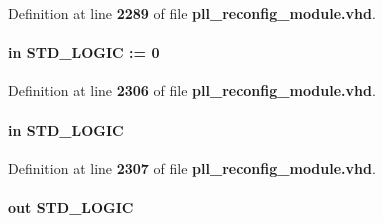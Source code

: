 Definition at line {\bf 2289} of file {\bf pll\+\_\+reconfig\+\_\+module.\+vhd}.

\paragraph[{write\+\_\+from\+\_\+rom}]{ {\bfseries \textcolor{keywordflow}{in}\textcolor{vhdlchar}{ }} {\bfseries \textcolor{comment}{S\+T\+D\+\_\+\+L\+O\+G\+IC}\textcolor{vhdlchar}{ }\textcolor{vhdlchar}{ }\textcolor{vhdlchar}{\+:}\textcolor{vhdlchar}{=}\textcolor{vhdlchar}{ }\textcolor{vhdlchar}{ }\textcolor{vhdlchar}{\textquotesingle{}}\textcolor{vhdlchar}{ } \textcolor{vhdldigit}{0} \textcolor{vhdlchar}{ }\textcolor{vhdlchar}{\textquotesingle{}}\textcolor{vhdlchar}{ }} \hspace{0.3cm}{\ttfamily [Port]}}\label{classpll__reconfig__module_a3a117e5372127e30390dddee9408218d}


Definition at line {\bf 2306} of file {\bf pll\+\_\+reconfig\+\_\+module.\+vhd}.

\paragraph[{write\+\_\+param}]{ {\bfseries \textcolor{keywordflow}{in}\textcolor{vhdlchar}{ }} {\bfseries \textcolor{comment}{S\+T\+D\+\_\+\+L\+O\+G\+IC}\textcolor{vhdlchar}{ }} \hspace{0.3cm}{\ttfamily [Port]}}\label{classpll__reconfig__module_a82026b0fa741fbd66ededcb4aed215f3}


Definition at line {\bf 2307} of file {\bf pll\+\_\+reconfig\+\_\+module.\+vhd}.

\paragraph[{write\+\_\+rom\+\_\+ena}]{ {\bfseries \textcolor{keywordflow}{out}\textcolor{vhdlchar}{ }} {\bfseries \textcolor{comment}{S\+T\+D\+\_\+\+L\+O\+G\+IC}\textcolor{vhdlchar}{ }} \hspace{0.3cm}{\ttfamily [Port]}}\label{classpll__reconfig__module_a1cb01f4ddb502de49ab2503974ce6437}


